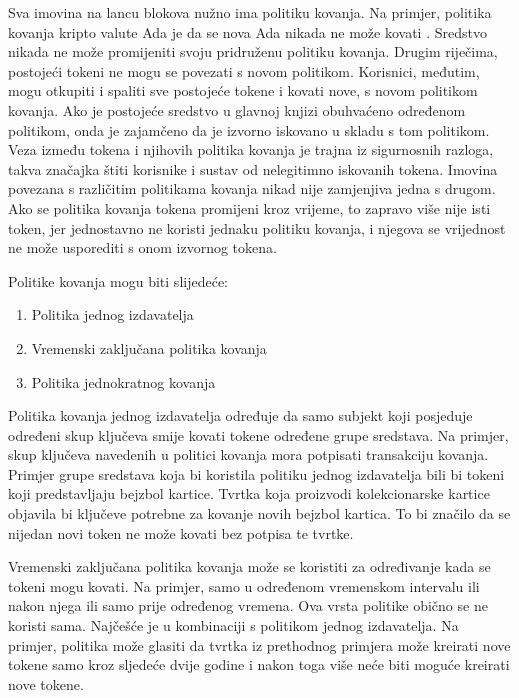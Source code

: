 \documentclass[times, utf8, diplomski]{fer}
\begin{document}
Sva imovina na lancu blokova nužno ima politiku kovanja. Na primjer, politika kovanja kripto valute Ada je da se nova Ada nikada ne može kovati \cite{kerber2019ouroboros}. Sredstvo nikada ne može promijeniti svoju pridruženu politiku kovanja. Drugim riječima, postojeći tokeni ne mogu se povezati s novom politikom. Korisnici, međutim, mogu otkupiti i spaliti sve postojeće tokene i kovati nove, s novom politikom kovanja. Ako je postojeće sredstvo u glavnoj knjizi obuhvaćeno određenom politikom, onda je zajamčeno da je izvorno iskovano u skladu s tom politikom. Veza između tokena i njihovih politika kovanja je trajna iz sigurnosnih razloga, takva značajka štiti korisnike i sustav od nelegitimno iskovanih tokena. Imovina povezana s različitim politikama kovanja nikad nije zamjenjiva jedna s drugom. Ako se politika kovanja tokena promijeni kroz vrijeme, to zapravo više nije isti token, jer jednostavno ne koristi jednaku politiku kovanja, i njegova se vrijednost ne može usporediti s onom izvornog tokena.

Politike kovanja mogu biti slijedeće:

\begin{enumerate}
    \item Politika jednog izdavatelja
    \item Vremenski zaključana politika kovanja
    \item Politika jednokratnog kovanja
\end{enumerate}

Politika kovanja jednog izdavatelja određuje da samo subjekt koji posjeduje određeni skup ključeva smije kovati tokene određene grupe sredstava. Na primjer, skup ključeva navedenih u politici kovanja mora potpisati transakciju kovanja. Primjer grupe sredstava koja bi koristila politiku jednog izdavatelja bili bi tokeni koji predstavljaju bejzbol kartice. Tvrtka koja proizvodi kolekcionarske kartice objavila bi ključeve potrebne za kovanje novih bejzbol kartica. To bi značilo da se nijedan novi token ne može kovati bez potpisa te tvrtke.

Vremenski zaključana politika kovanja može se koristiti za određivanje kada se tokeni mogu kovati. Na primjer, samo u određenom vremenskom intervalu ili nakon njega ili samo prije određenog vremena. Ova vrsta politike obično se ne koristi sama. Najčešće je u kombinaciji s politikom jednog izdavatelja. Na primjer, politika može glasiti da tvrtka iz prethodnog primjera može kreirati nove tokene samo kroz sljedeće dvije godine i nakon toga više neće biti moguće kreirati nove tokene.
\end{document}
